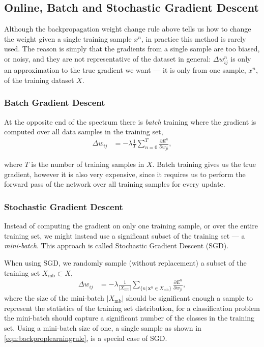 \documentclass[thesis]{subfiles}
\begin{document}
\subsection{Online, Batch and Stochastic Gradient Descent}
Although the backpropagation weight change rule above tells us how to change the weight given a single training sample $x^n$, in practice this method is rarely used. The reason is simply that the gradients from a single sample are too biased, or noisy, and they are not representative of the dataset in general: $\Delta w^n_{ij}$ is only an approximation to the true gradient we want --- it is only from one sample, $x^n$, of the training dataset $X$. 

\subsubsection{Batch Gradient Descent}
At the opposite end of the spectrum there is \emph{batch} training where the gradient is computed over all data samples in the training set,
\begin{equation}
\begin{aligned}
    \Delta w_{ij} &= -\lambda\frac{1}{T} \sum^T_{n=0} \frac{\partial E^n}{\partial w_{ji}},
     \label{eqn:batchlearningrule}
\end{aligned}
\end{equation}

where $T$ is the number of training samples in $X$. Batch training gives us the true gradient, however it is also very expensive, since it requires us to perform the forward pass of the network over all training samples for every update. 

\subsubsection{Stochastic Gradient Descent}
Instead of computing the gradient on only one training sample, or over the entire training set, we might instead use a significant subset of the training set --- a \emph{mini-batch}. This approach is called Stochastic Gradient Descent (SGD).

When using SGD, we randomly sample (without replacement) a subset of the training set $X_{\textrm{mb}} \subset X$,
\begin{equation}
\begin{aligned}
    \Delta w_{ij} &= -\lambda \frac{1}{|X_{\textrm{mb}}|} \sum_{\{n|\,\mathbf{x}^n \in X_{\textrm{mb}}\}} \frac{\partial E^n}{\partial w_{ji}},
     \label{eqn:sgdrule}
\end{aligned}
\end{equation}
where the size of the mini-batch $|X_{\textrm{mb}}|$ should be significant enough a sample to represent the statistics of the training set distribution, \ie for a classification problem the mini-batch should capture a significant number of the classes in the training set. Using a mini-batch size of one, \ie{}a single sample as shown in \cref{eqn:backproplearningrule}, is a special case of SGD\@. 
\end{document}
